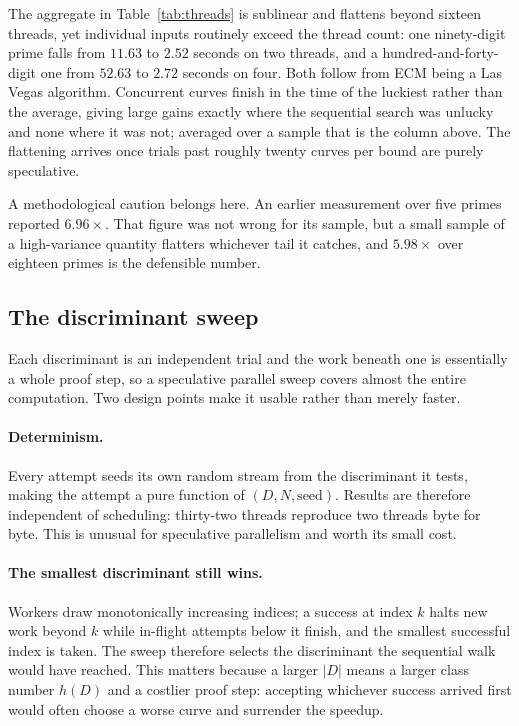 \documentclass[11pt,a4paper]{article}
\begin{document}
The aggregate in Table~\ref{tab:threads} is sublinear and flattens beyond
sixteen threads, yet individual inputs routinely exceed the thread count:
one ninety-digit prime falls from $11.63$ to $2.52$ seconds on two
threads, and a hundred-and-forty-digit one from $52.63$ to $2.72$ seconds
on four. Both follow from ECM being a Las Vegas algorithm. Concurrent
curves finish in the time of the luckiest rather than the average, giving
large gains exactly where the sequential search was unlucky and none
where it was not; averaged over a sample that is the column above. The
flattening arrives once trials past roughly twenty curves per bound are
purely speculative.

A methodological caution belongs here. An earlier measurement over five
primes reported $6.96\times$. That figure was not wrong for its sample,
but a small sample of a high-variance quantity flatters whichever tail it
catches, and $5.98\times$ over eighteen primes is the defensible number.

\subsection{The discriminant sweep}

Each discriminant is an independent trial and the work beneath one is
essentially a whole proof step, so a speculative parallel sweep covers
almost the entire computation. Two design points make it usable rather
than merely faster.

\paragraph{Determinism.} Every attempt seeds its own random stream from
the discriminant it tests, making the attempt a pure function of
$(D, N, \text{seed})$. Results are therefore independent of scheduling:
thirty-two threads reproduce two threads byte for byte. This is unusual
for speculative parallelism and worth its small cost.

\paragraph{The smallest discriminant still wins.} Workers draw
monotonically increasing indices; a success at index $k$ halts new work
beyond $k$ while in-flight attempts below it finish, and the smallest
successful index is taken. The sweep therefore selects the discriminant
the sequential walk would have reached. This matters because a larger
$|D|$ means a larger class number $h(D)$ and a costlier proof step:
accepting whichever success arrived first would often choose a worse
curve and surrender the speedup.
\end{document}
